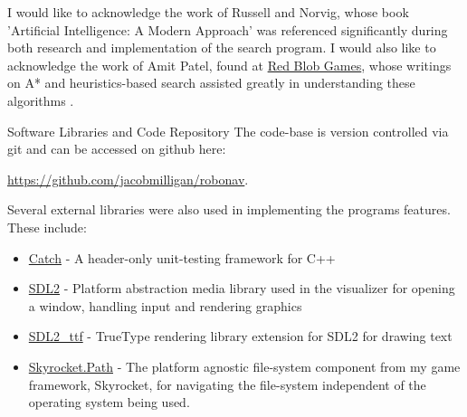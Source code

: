 \begin{acknowledgements}
	I would like to acknowledge the work of Russell and Norvig, whose book 'Artificial Intelligence: A Modern Approach' \parencite{aiama} was referenced significantly during both research and implementation of the search program. I would also like to acknowledge the work of Amit Patel, found at \href{http://www.redblobgames.com/}{Red Blob Games}, whose writings on A* and heuristics-based search assisted greatly in understanding these algorithms \parencite{redblob}.
\end{acknowledgements}

\vspace{2em}

\begin{frontmatter}{Software Libraries and Code Repository}
The code-base is version controlled via git and can be accessed on github here:

\begin{center}
\href{https://github.com/jacobmilligan/robonav}{https://github.com/jacobmilligan/robonav}.
\end{center}

Several external libraries were also used in implementing the programs features. These include:
\begin{itemize}
	\item \href{https://github.com/philsquared/Catch}{Catch} - A header-only unit-testing framework for C++
	\item \href{https://www.libsdl.org/download-2.0.php}{SDL2} - Platform abstraction media library used in the visualizer for opening a window, handling input and rendering graphics
	\item \href{https://www.libsdl.org/projects/SDL_ttf/}{SDL2\_ttf} - TrueType rendering library extension for SDL2 for drawing text
	\item \href{https://github.com/jacobmilligan/Skyrocket}{Skyrocket.Path} - The platform agnostic file-system component from my game framework, Skyrocket, for navigating the file-system independent of the operating system being used.
\end{itemize}
\end{frontmatter}
